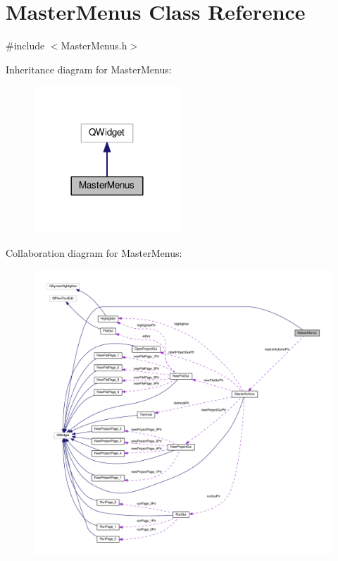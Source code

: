 \hypertarget{class_master_menus}{\section{Master\-Menus Class Reference}
\label{class_master_menus}
}


{\ttfamily \#include $<$Master\-Menus.\-h$>$}



Inheritance diagram for Master\-Menus\-:\nopagebreak
\begin{figure}[H]
\begin{center}
\leavevmode
\includegraphics[width=156pt]{class_master_menus__inherit__graph}
\end{center}
\end{figure}


Collaboration diagram for Master\-Menus\-:\nopagebreak
\begin{figure}[H]
\begin{center}
\leavevmode
\includegraphics[width=350pt]{class_master_menus__coll__graph}
\end{center}
\end{figure}
